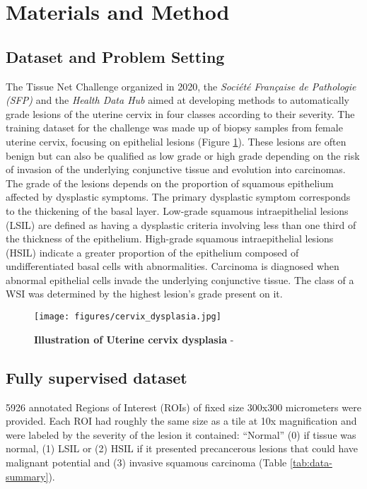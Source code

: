 \section{Materials and Method}

\subsection{Dataset and Problem Setting}

The Tissue Net Challenge \citep{drivendata_tissuenet_nodate} organized in 2020, the \textit{Soci\'et\'e Française de Pathologie (SFP)} and the \textit{Health Data Hub} aimed at developing methods to automatically grade lesions of the uterine cervix in four classes according to their severity. 
​​The training dataset for the challenge was made up of biopsy samples from female uterine cervix, focusing on epithelial lesions (Figure \ref{fig:uterine_cervix}). These lesions are often benign but can also be qualified as low grade or high grade depending on the risk of invasion of the underlying conjunctive tissue and evolution into carcinomas. The grade of the lesions depends on the proportion of squamous epithelium affected by dysplastic symptoms. The primary dysplastic symptom corresponds to the thickening of the basal layer. Low-grade squamous intraepithelial lesions (LSIL) are defined as having a dysplastic criteria involving less than one third of the thickness of the epithelium. High-grade squamous intraepithelial lesions (HSIL) indicate a greater proportion of the epithelium composed of undifferentiated basal cells with abnormalities. Carcinoma is diagnosed when abnormal epithelial cells invade the underlying conjunctive tissue. The class of a WSI was determined by the highest lesion's grade present on it.

\begin{figure}[!b]
\centering
\texttt{[image: figures/cervix\_dysplasia.jpg]}
\caption{\textbf{Illustration of Uterine cervix dysplasia} - \citep{national_cancer_institute_definition_2011} }
\label{fig:uterine_cervix}
\end{figure}




\subsection{Fully supervised dataset}

5926 annotated Regions of Interest (ROIs) of fixed size 300x300 micrometers were provided. Each ROI had roughly the same size as a tile at 10x magnification and were labeled by the severity of the lesion it contained: “Normal” (0) if tissue was normal, (1) LSIL or (2) HSIL if it presented precancerous lesions that could have malignant potential and (3) invasive squamous carcinoma (Table \ref{tab:data-summary}).


